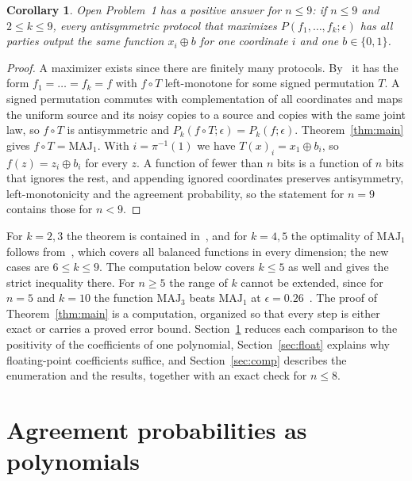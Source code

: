 \documentclass[11pt]{amsart}
\newtheorem{corollary}[theorem]{Corollary}
\theoremstyle{remark}
\newcommand{\MAJ}{\mathrm{MAJ}}
\begin{document}
\begin{corollary}\label{cor:op1}
Open Problem~1 has a positive answer for $n\le 9$: if $n\le 9$ and $2\le k\le 9$, every antisymmetric protocol that
maximizes $P(f_1,\dots,f_k;\epsilon)$ has all parties output the same function $x_i\oplus b$ for one coordinate $i$
and one $b\in\{0,1\}$.
\end{corollary}

\begin{proof}
A maximizer exists since there are finitely many protocols. By~\cite[Theorem~1.4]{MO05} it has the form
$f_1=\dots=f_k=f$ with $f\circ T$ left-monotone for some signed permutation $T$. A signed permutation commutes with
complementation of all coordinates and maps the uniform source and its noisy copies to a source and copies with the
same joint law, so $f\circ T$ is antisymmetric and $P_k(f\circ T;\epsilon)=P_k(f;\epsilon)$. Theorem~\ref{thm:main}
gives $f\circ T=\MAJ_1$. With $i=\pi^{-1}(1)$ we have $T(x)_i=x_1\oplus b_i$, so $f(z)=z_i\oplus b_i$ for every $z$. A function of fewer than $n$ bits is a
function of $n$ bits that ignores the rest, and appending ignored coordinates preserves antisymmetry,
left-monotonicity and the agreement probability, so the statement for $n=9$ contains those for $n<9$.
\end{proof}

For $k=2,3$ the theorem is contained in~\cite[Theorem~1.3]{MO05}, and for $k=4,5$ the optimality of $\MAJ_1$ follows
from~\cite[Corollary~2]{Yu23}, which covers all balanced functions in every dimension; the new cases are
$6\le k\le 9$. The computation below covers $k\le5$ as well and gives the strict inequality there.
For $n\ge5$ the range of $k$ cannot be extended, since for $n=5$ and $k=10$ the function $\MAJ_3$ beats $\MAJ_1$ at
$\epsilon=0.26$~\cite[Proposition~5.2]{MO05}. The proof of Theorem~\ref{thm:main} is a computation, organized so that
every step is either exact or carries a proved error bound. Section~\ref{sec:poly} reduces each comparison to the
positivity of the coefficients of one polynomial, Section~\ref{sec:float} explains why floating-point coefficients
suffice, and Section~\ref{sec:comp} describes the enumeration and the results, together with an exact check for
$n\le8$.

\section{Agreement probabilities as polynomials}\label{sec:poly}
\end{document}
